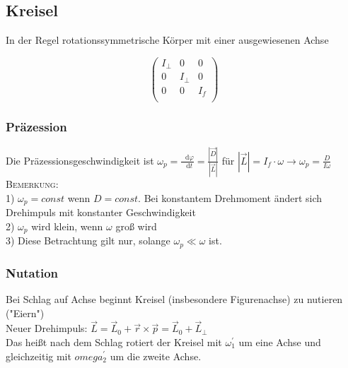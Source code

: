 \documentclass[a4paper,12pt]{report}
\newcommand*\diff{\mathop{}\!\mathrm{d}}
\begin{document}
\subsection{Kreisel}

In der Regel rotationssymmetrische Körper mit einer ausgewiesenen Achse

\begin{equation*}
\begin{pmatrix}
I_\perp & 0 & 0 \\
0 & I_\perp & 0 \\
0 & 0 & I_f \\
\end{pmatrix}
\end{equation*}

\subsubsection{Präzession}

Die Präzessionsgeschwindigkeit ist $ \omega_p = \frac{\diff \varphi}{\diff t} = \frac{|\vec{D}|}{|\vec{L}|} $ für $| \vec{L} | = I_f \cdot \omega \rightarrow \omega_p = \frac{D}{I \omega}$ \\


\textsc{Bemerkung: }\\

1) $\omega_p= const$ wenn $D=const.$  Bei konstantem Drehmoment ändert sich Drehimpuls mit konstanter Geschwindigkeit \\

	2) $\omega_p$ wird klein, wenn $\omega$  groß wird\\

	3) Diese Betrachtung gilt nur, solange $\omega_p \ll \omega $ ist.\\


\subsubsection{Nutation}

Bei Schlag auf Achse beginnt Kreisel (insbesondere Figurenachse) zu nutieren ("Eiern") \\

Neuer Drehimpuls: $ \vec{L} = \vec{L}_0 + \vec{r} \times \vec{p} = \vec{L}_0 + \vec{L}_\perp $ \\

Das heißt nach dem Schlag rotiert der Kreisel mit  $\omega_{1}^{'}$   um eine Achse  und gleichzeitig mit $omega_{2}^{'} $ um die zweite Achse.\\
\end{document}
